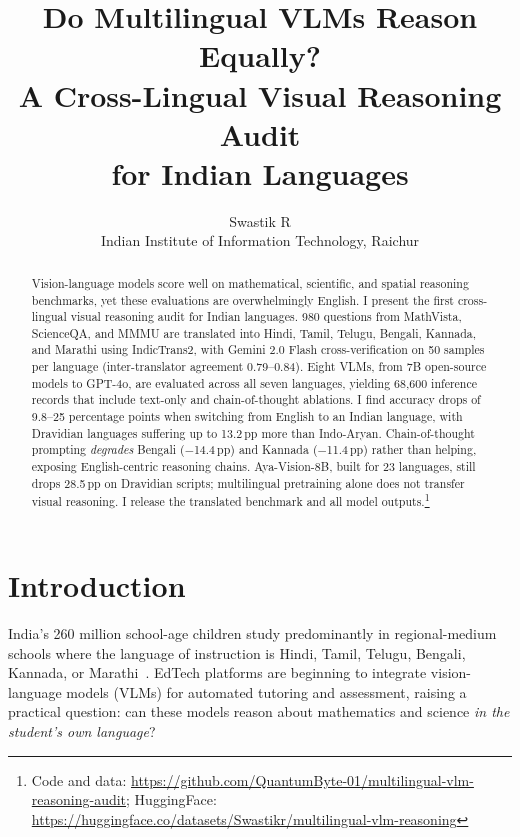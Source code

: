\documentclass[11pt,a4paper]{article}
\title{Do Multilingual VLMs Reason Equally?\\ A Cross-Lingual Visual Reasoning Audit\\ for Indian Languages}
\author{Swastik R\\[2pt]
\small Indian Institute of Information Technology, Raichur}
\date{}
\newcommand{\pp}{\,\text{pp}}
\begin{document}
\maketitle

\begin{abstract}
Vision-language models score well on mathematical, scientific, and spatial reasoning benchmarks, yet these evaluations are overwhelmingly English.
I present the first cross-lingual visual reasoning audit for Indian languages.
980 questions from MathVista, ScienceQA, and MMMU are translated into Hindi, Tamil, Telugu, Bengali, Kannada, and Marathi using IndicTrans2, with Gemini 2.0 Flash cross-verification on 50 samples per language (inter-translator agreement 0.79--0.84).
Eight VLMs, from 7B open-source models to GPT-4o, are evaluated across all seven languages, yielding 68{,}600 inference records that include text-only and chain-of-thought ablations.
I find accuracy drops of 9.8--25 percentage points when switching from English to an Indian language, with Dravidian languages suffering up to 13.2$\pp$ more than Indo-Aryan.
Chain-of-thought prompting \emph{degrades} Bengali ($-$14.4$\pp$) and Kannada ($-$11.4$\pp$) rather than helping, exposing English-centric reasoning chains.
Aya-Vision-8B, built for 23 languages, still drops 28.5$\pp$ on Dravidian scripts; multilingual pretraining alone does not transfer visual reasoning.
I release the translated benchmark and all model outputs.\footnote{Code and data: \url{https://github.com/QuantumByte-01/multilingual-vlm-reasoning-audit}; HuggingFace: \url{https://huggingface.co/datasets/Swastikr/multilingual-vlm-reasoning}}
\end{abstract}

\section{Introduction}
\label{sec:intro}

India's 260 million school-age children study predominantly in regional-medium schools where the language of instruction is Hindi, Tamil, Telugu, Bengali, Kannada, or Marathi~\citep{nep2020}.
EdTech platforms are beginning to integrate vision-language models (VLMs) for automated tutoring and assessment, raising a practical question: can these models reason about mathematics and science \emph{in the student's own language}?
\end{document}
